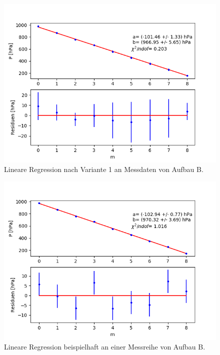 \documentclass[12pt,a4paper]{article}
\begin{document}
\begin{figure}
\centering
\includegraphics[scale=0.8]{Bilder/Druck_B_Var1.png}
\caption{Lineare Regression nach Variante 1 an Messdaten von Aufbau B.}
\label{fig:Druck_B_Var1}
\end{figure}

\begin{figure}
\centering
\includegraphics[scale=0.8]{Bilder/Druck_B_Var2.png}
\caption{Lineare Regression beispielhaft an einer Messreihe von Aufbau B.}
\label{fig:Druck_B_Var2}
\end{figure}
\end{document}
